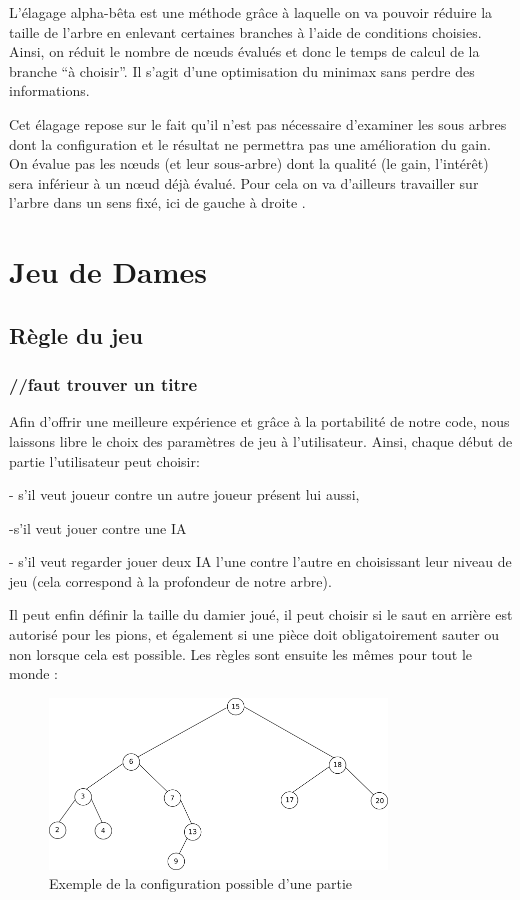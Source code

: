 \documentclass[12,french]{report}
\begin{document}
L'élagage alpha-bêta est une méthode grâce à laquelle on
va pouvoir réduire la taille de l'arbre en enlevant certaines branches
à l'aide de conditions choisies. Ainsi, on réduit le nombre de nœuds
évalués et donc le temps de calcul de la branche ``à choisir''.
Il s'agit d'une optimisation du minimax sans perdre des informations. 

Cet élagage repose sur le fait qu'il n'est pas nécessaire d'examiner
les sous arbres dont la configuration et le résultat ne permettra
pas une amélioration du gain. On évalue pas les nœuds (et leur sous-arbre)
dont la qualité (le gain, l'intérêt) sera inférieur à un nœud déjà
évalué. Pour cela on va d'ailleurs travailler sur l'arbre dans un
sens fixé, ici de gauche à droite . 


\chapter{Jeu de Dames}

\section{Règle du jeu}


\subsection{//faut trouver un titre}

Afin d'offrir une meilleure expérience et grâce à la portabilité de notre code, nous laissons libre le choix des paramètres de jeu à l'utilisateur. Ainsi, chaque début de partie l'utilisateur peut choisir:

- s'il veut joueur contre un autre joueur présent lui aussi, 

-s'il veut jouer contre une IA 

- s'il veut regarder jouer deux IA l'une contre l'autre en choisissant leur niveau de jeu (cela correspond à la profondeur de notre arbre). 

Il peut enfin définir la taille du damier joué, il peut choisir si le saut en arrière est autorisé pour les pions, et également si une pièce doit obligatoirement sauter ou non lorsque cela est possible. Les règles sont ensuite les mêmes pour tout le monde :\\
\begin{figure}[H]
	\center
	\includegraphics[width=0.8\textwidth]{./Images/arbre} %
	\caption{Exemple de la configuration possible d'une partie}
\end{figure}\vspace{0.2cm}
\end{document}
